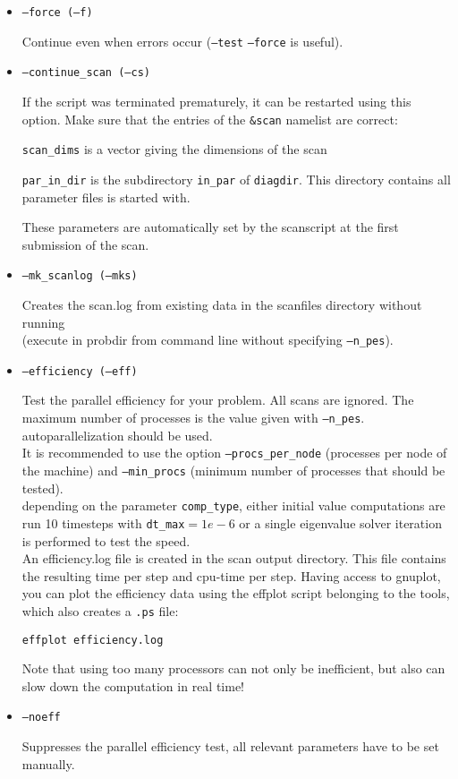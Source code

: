 \documentclass[12pt]{article}
\begin{document}
\begin{itemize}
\item \texttt{--force (--f)}

Continue even when errors occur (\texttt{--test} \texttt{--force} is
useful).

\item \texttt{--continue\_scan (--cs)}

If the script was terminated prematurely, it can be restarted using this option.
Make sure that the entries of the \texttt{\&scan} namelist
are correct:

\texttt{scan\_dims} is a vector giving the dimensions of the scan

\texttt{par\_in\_dir} is the subdirectory \texttt{in\_par} of \texttt{diagdir}. This directory contains all
parameter files \gene is started with.

These parameters are automatically set by the scanscript at the first
submission of the scan.

\item \texttt{--mk\_scanlog (--mks)}

Creates the scan.log from existing data in the scanfiles directory without running
\gene\\ (execute in probdir from command line without specifying
\texttt{--n\_pes}).

\item \texttt{--efficiency (--eff)}

Test the parallel efficiency for your problem. All scans are ignored.
The maximum number of processes is the value given with \texttt{--n\_pes}. \gene
autoparallelization should be used.\\
It is recommended to use the option \texttt{--procs\_per\_node}
(processes per node of the machine) and \texttt{--min\_procs} (minimum
number of processes that should be tested).\\
depending on the parameter \texttt{comp\_type}, either initial value
computations are run 10 timesteps with \texttt{dt\_max}$=1e-6$ or
a single eigenvalue solver iteration is performed to test the speed. \\
An efficiency.log file is created in the scan output directory. This
file contains the resulting time per step and cpu-time per step. Having
access to gnuplot, you can
plot the efficiency data using the effplot script belonging to the \gene
tools, which also creates a \texttt{.ps} file:

\texttt{effplot efficiency.log}

Note that using too many processors can not only be inefficient, but also can slow down the
computation in real time!

\item \texttt{--noeff}

Suppresses the parallel efficiency test, all relevant parameters have to
be set manually.
\end{itemize}
\end{document}
